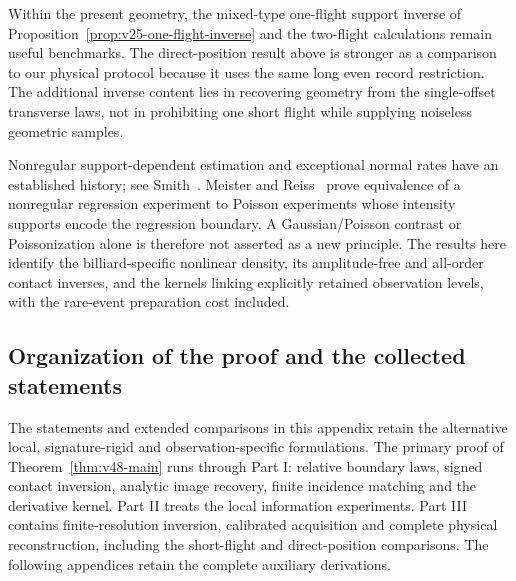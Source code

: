 Within the present geometry, the mixed-type one-flight support inverse of
Proposition~\ref{prop:v25-one-flight-inverse} and the two-flight calculations
remain useful benchmarks.  The direct-position result above is stronger as
a comparison to our physical protocol because it uses the same long even
record restriction.  The additional inverse content lies in recovering
geometry from the single-offset transverse laws, not in prohibiting one
short flight while supplying noiseless geometric samples.

Nonregular support-dependent estimation and exceptional normal rates have
an established history; see Smith~\cite{Smith1985}.  Meister and
Reiss~\cite{MeisterReiss} prove equivalence of a nonregular regression
experiment to Poisson experiments whose intensity supports encode the
regression boundary.  A Gaussian/Poisson contrast or Poissonization alone
is therefore not asserted as a new principle.  The results here identify
the billiard-specific nonlinear density, its amplitude-free and all-order
contact inverses, and the kernels linking explicitly retained observation
levels, with the rare-event preparation cost included.

\subsection{Organization of the proof and the collected statements}

The statements and extended comparisons in this appendix retain the
alternative local, signature-rigid and observation-specific formulations.
The primary proof of Theorem~\ref{thm:v48-main} runs through Part I:
relative boundary laws, signed contact inversion, analytic image recovery,
finite incidence matching and the derivative kernel.  Part II treats the
local information experiments.  Part III contains finite-resolution
inversion, calibrated acquisition and complete physical reconstruction,
including the short-flight and direct-position comparisons.
The following appendices retain the complete auxiliary derivations.
